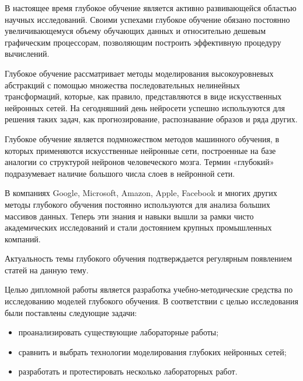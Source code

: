 \intro 

В настоящее время глубокое обучение является активно развивающейся областью научных исследований. Своими успехами глубокое обучение обязано постоянно увеличивающемуся объему обучающих данных и относительно дешевым графическим процессорам, позволяющим построить эффективную процедуру вычислений.

Глубокое обучение рассматривает методы моделирования высокоуровневых абстракций с помощью множества последовательных нелинейных трансформаций, которые, как правило, представляются в виде искусственных нейронных сетей. На сегодняшний день нейросети успешно используются для решения таких задач, как прогнозирование, распознавание образов и ряда других.


Глубокое обучение является подмножеством методов машинного обучения, в которых применяются искусственные нейронные сети, построенные на базе аналогии со структурой нейронов человеческого мозга. Термин «глубокий» подразумевает наличие большого числа слоев в нейронной сети. 

В компаниях Google, Microsoft, Amazon, Apple, Facebook и многих других методы глубокого обучения постоянно используются для анализа больших массивов данных. Теперь эти знания и навыки вышли за рамки чисто академических исследований и стали достоянием крупных промышленных компаний. 

Актуальность темы глубокого обучения подтверждается регулярным появлением статей на данную тему.

Целью дипломной работы  является разработка учебно-методические средства по исследованию моделей глубокого обучения. 
В соответствии с целью исследования были поставлены следующие задачи:
\begin{itemize}
\item проанализировать существующие лабораторные работы;
\item  сравнить и выбрать технологии моделирования глубоких  нейронных сетей;
\item разработать и протестировать несколько лабораторных работ.
\end{itemize}